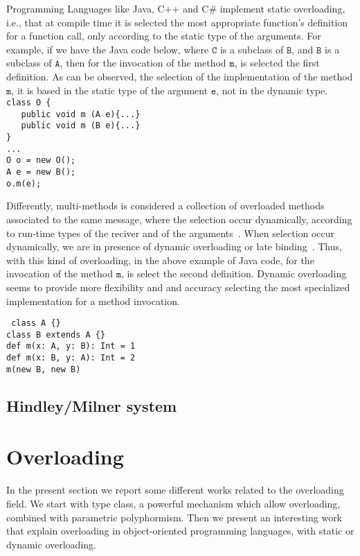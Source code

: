 \documentclass[hidelinks, twocolumn]{article}
\begin{document}
Programming Languages like Java, C++ and C\# implement static overloading, i.e., that at compile time it is selected the most appropriate  function's definition for a function call, only according to the static type of the arguments. For example, if we have the Java code below, where $\texttt{C}$ is a subclass of $\texttt{B}$, and $\texttt{B}$ is a subclass of $\texttt{A}$, then for the invocation of the method $\texttt{m}$, is selected the first definition. As can be observed, the selection of the implementation of the method $\texttt{m}$, it is based in the static type of the argument $\texttt{e}$, not in the dynamic type.                                   \\
\texttt{class O \{\\
\ \ \ public void m (A e)\{...\}\\
\ \ \ public void m (B e)\{...\}\\
\}\\
...\\
O o = new O();\\
A e = new B();\\
o.m(e);}        


Differently, multi-methods is considered a collection of overloaded methods associated to the same message, where the selection occur dynamically, according to run-time types of the reciver and of the arguments~\cite{FJM}. When selection occur dynamically, we are in presence of dynamic overloading or late binding~\cite{castagna1997337}. Thus, with this kind of overloading, in the above example of Java code, for the invocation of the method $\texttt{m}$, is select the second definition. Dynamic overloading seems to provide more flexibility and and accuracy selecting the most specialized implementation for a method invocation.

\texttt{
class A \{\} \\
class B extends A \{\} \\
def m(x: A, y: B): Int = 1\\
def m(x: B, y: A): Int = 2\\
m(new B, new B)\\ }

\subsection{Hindley/Milner system}

\section{Overloading}\label{section:polymorphism}
In the present section we report some different works related to the overloading field. We start with type class, a powerful mechanism which allow overloading, combined with parametric polyphormism. Then we present an interesting work that explain overloading in object-oriented programming languages, with static or dynamic overloading.
\end{document}
